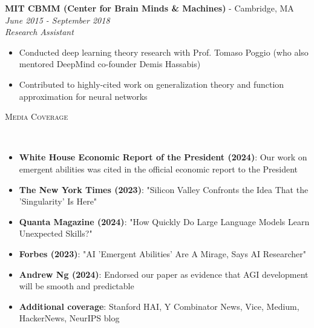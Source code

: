 \documentclass{article}
\newenvironment{changemargin}[2]{%
  \begin{list}{}{%
    \setlength{\topsep}{0pt}%
    \setlength{\leftmargin}{#1}%
    \setlength{\rightmargin}{#2}%
    \setlength{\listparindent}{\parindent}%
    \setlength{\itemindent}{\parindent}%
    \setlength{\parsep}{\parskip}%
  }%
  \item[]}{\end{list}
}
\newcommand{\lineover}{
	\begin{changemargin}{-0.05in}{-0.05in}
		\vspace*{-8pt}
		\hrulefill \\
		\vspace*{-2pt}
	\end{changemargin}
}
\newcommand{\header}[1]{
	\begin{changemargin}{-0.5in}{-0.5in}
		\scshape{#1}\\
  	\lineover
	\end{changemargin}
}
\newenvironment{body} {
	\vspace*{-16pt}
	\begin{changemargin}{-0.25in}{-0.5in}
  }	
	{\end{changemargin}
}
\begin{document}
\begin{body}
	\textbf{MIT CBMM (Center for Brain Minds \& Machines)} - Cambridge, MA \hfill \emph{June 2015 - September 2018}\\
	\emph{Research Assistant}\\
	\vspace*{-3pt}
	\begin{itemize} \itemsep -2pt
        \item Conducted deep learning theory research with Prof. Tomaso Poggio (who also mentored DeepMind co-founder Demis Hassabis)
        \item Contributed to highly-cited work on generalization theory and function approximation for neural networks
	\end{itemize}
    
\end{body}


\header{Media Coverage}
\begin{body}
\vspace{16pt}
\begin{itemize} \itemsep -2pt
    \item \textbf{White House Economic Report of the President (2024)}: Our work on emergent abilities was cited in the official economic report to the President
    \item \textbf{The New York Times (2023)}: "Silicon Valley Confronts the Idea That the 'Singularity' Is Here"
    \item \textbf{Quanta Magazine (2024)}: "How Quickly Do Large Language Models Learn Unexpected Skills?"
    \item \textbf{Forbes (2023)}: "AI 'Emergent Abilities' Are A Mirage, Says AI Researcher"
    \item \textbf{Andrew Ng (2024)}: Endorsed our paper as evidence that AGI development will be smooth and predictable
    \item \textbf{Additional coverage}: Stanford HAI, Y Combinator News, Vice, Medium, HackerNews, NeurIPS blog
\end{itemize}
\end{body}

\end{document}
